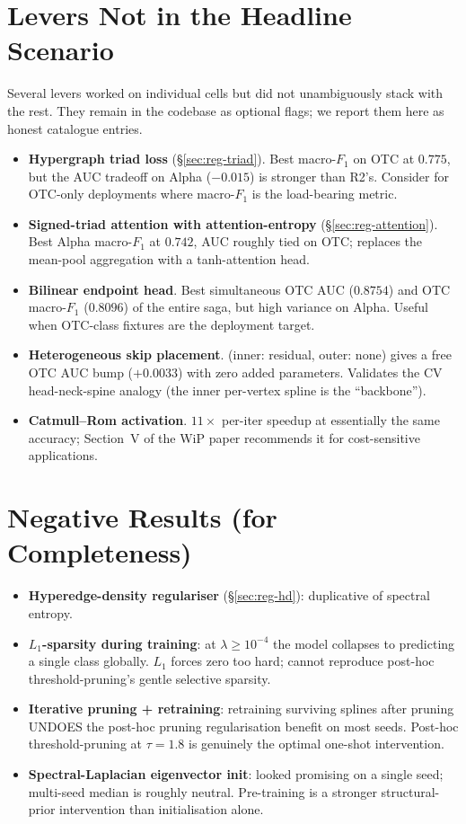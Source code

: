 \documentclass[11pt, a4paper]{article}
\begin{document}
\section{Levers Not in the Headline Scenario}

Several levers worked on individual cells but did not
unambiguously stack with the rest. They remain in the codebase as
optional flags; we report them here as honest catalogue entries.

\begin{itemize}
\item \textbf{Hypergraph triad loss} (\S\ref{sec:reg-triad}). Best
  macro-$F_1$ on OTC at $0.775$, but the AUC tradeoff on Alpha
  ($-0.015$) is stronger than R2's. Consider for OTC-only
  deployments where macro-$F_1$ is the load-bearing metric.
\item \textbf{Signed-triad attention with attention-entropy}
  (\S\ref{sec:reg-attention}). Best Alpha macro-$F_1$ at $0.742$,
  AUC roughly tied on OTC; replaces the mean-pool aggregation with
  a tanh-attention head.
\item \textbf{Bilinear endpoint head}. Best simultaneous OTC AUC
  ($0.8754$) and OTC macro-$F_1$ ($0.8096$) of the entire saga,
  but high variance on Alpha. Useful when OTC-class fixtures are
  the deployment target.
\item \textbf{Heterogeneous skip placement}. (inner: residual,
  outer: none) gives a free OTC AUC bump ($+0.0033$) with zero
  added parameters. Validates the CV head-neck-spine analogy
  (the inner per-vertex spline is the ``backbone'').
\item \textbf{Catmull--Rom activation}. $11\times$ per-iter
  speedup at essentially the same accuracy; Section~V of the WiP
  paper recommends it for cost-sensitive applications.
\end{itemize}

\section{Negative Results (for Completeness)}

\begin{itemize}
\item \textbf{Hyperedge-density regulariser} (\S\ref{sec:reg-hd}):
  duplicative of spectral entropy.
\item \textbf{$L_1$-sparsity during training}: at $\lambda \geq 10^{-4}$
  the model collapses to predicting a single class globally.
  $L_1$ forces zero too hard; cannot reproduce post-hoc
  threshold-pruning's gentle selective sparsity.
\item \textbf{Iterative pruning + retraining}: retraining
  surviving splines after pruning UNDOES the post-hoc pruning
  regularisation benefit on most seeds. Post-hoc threshold-pruning
  at $\tau\!=\!1.8$ is genuinely the optimal one-shot intervention.
\item \textbf{Spectral-Laplacian eigenvector init}: looked
  promising on a single seed; multi-seed median is roughly neutral.
  Pre-training is a stronger structural-prior intervention than
  initialisation alone.
\end{itemize}
\end{document}
